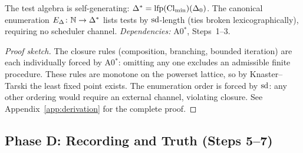 \begin{theorem}
\label{thm:endogenous}
The test algebra is self-generating: $\Delta^* = \mathrm{lfp}(\mathrm{Cl}_{\min})(\Delta_0)$.
The canonical enumeration $E_\Delta \colon \mathbb{N} \to \Delta^*$ lists tests by $\mathrm{sd}$-length (ties broken lexicographically), requiring no scheduler channel.
\emph{Dependencies:} A0$^*$, Steps~1--3.
\begin{proof}[Proof sketch]
The closure rules (composition, branching, bounded iteration) are each individually forced by A0$^*$: omitting any one excludes an admissible finite procedure.  These rules are monotone on the powerset lattice, so by Knaster--Tarski the least fixed point exists.  The enumeration order is forced by $\mathrm{sd}$: any other ordering would require an external channel, violating closure.
See Appendix~\ref{app:derivation} for the complete proof.
\end{proof}
\end{theorem}

\subsection{Phase D: Recording and Truth (Steps 5--7)}
\label{sec:derivation:recording}


